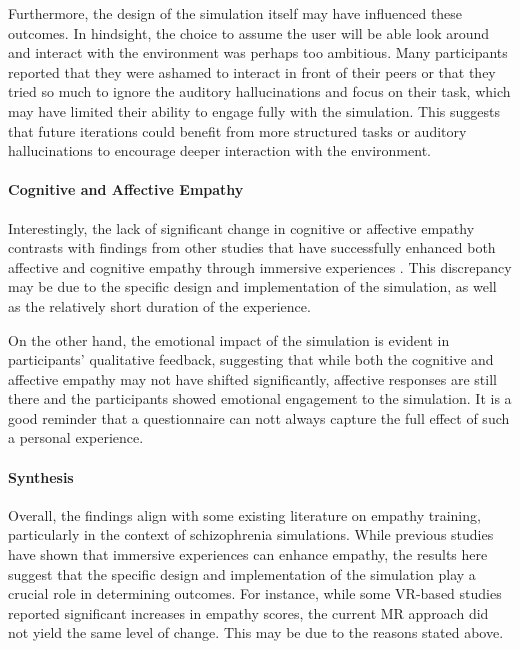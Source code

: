 \vspace{1em}

Furthermore, the design of the simulation itself may have influenced these outcomes. In hindsight, the choice to assume the user will be able look around and interact with the environment was perhaps too ambitious. Many participants reported that they were ashamed to interact in front of their peers or that they tried so much to ignore the auditory hallucinations and focus on their task, which may have limited their ability to engage fully with the simulation. This suggests that future iterations could benefit from more structured tasks or auditory hallucinations to encourage deeper interaction with the environment.

\paragraph{Cognitive and Affective Empathy}
Interestingly, the lack of significant change in cognitive or affective empathy contrasts with findings from other studies that have successfully enhanced both affective and cognitive empathy through immersive experiences \cite{Formosa2018,Alieldin2024,Mattsson2024,Zare-Bidaki2022,Bakk2023}. This discrepancy may be due to the specific design and implementation of the simulation, as well as the relatively short duration of the experience.

On the other hand, the emotional impact of the simulation is evident in participants' qualitative feedback, suggesting that while both the cognitive and affective empathy may not have shifted significantly, affective responses are still there and the participants showed emotional engagement to the simulation. It is a good reminder that a questionnaire can nott always capture the full effect of such a personal experience.

\paragraph{Synthesis}
Overall, the findings align with some existing literature on empathy training, particularly in the context of schizophrenia simulations. While previous studies have shown that immersive experiences can enhance empathy, the results here suggest that the specific design and implementation of the simulation play a crucial role in determining outcomes. For instance, while some VR-based studies reported significant increases in empathy scores, the current MR approach did not yield the same level of change. This may be due to the reasons stated above.


